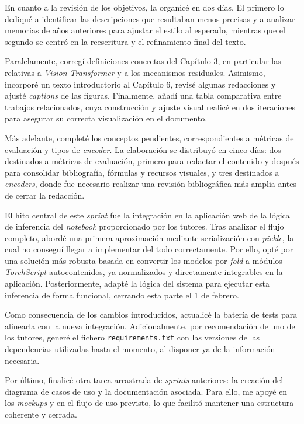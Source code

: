En cuanto a la revisión de los objetivos, la organicé en dos días. El primero lo dediqué a identificar las descripciones que resultaban menos precisas y a analizar memorias de años anteriores para ajustar el estilo al esperado, mientras que el segundo se centró en la reescritura y el refinamiento final del texto.

Paralelamente, corregí definiciones concretas del Capítulo 3, en particular las relativas a \textit{Vision Transformer} y a los mecanismos residuales. Asimismo, incorporé un texto introductorio al Capítulo 6, revisé algunas redacciones y ajusté \textit{captions} de las figuras. Finalmente, añadí una tabla comparativa entre trabajos relacionados, cuya construcción y ajuste visual realicé en dos iteraciones para asegurar su correcta visualización en el documento.

Más adelante, completé los conceptos pendientes, correspondientes a métricas de evaluación y tipos de \textit{encoder}. La elaboración se distribuyó en cinco días: dos destinados a métricas de evaluación, primero para redactar el contenido y después para consolidar bibliografía, fórmulas y recursos visuales, y tres destinados a \textit{encoders}, donde fue necesario realizar una revisión bibliográfica más amplia antes de cerrar la redacción.

El hito central de este \textit{sprint} fue la integración en la aplicación web de la lógica de inferencia del \textit{notebook} proporcionado por los tutores. Tras analizar el flujo completo, abordé una primera aproximación mediante serialización con \textit{pickle}, la cual no conseguí llegar a implementar del todo correctamente. Por ello, opté por una solución más robusta basada en convertir los modelos por \textit{fold} a módulos \textit{TorchScript} autocontenidos, ya normalizados y directamente integrables en la aplicación. Posteriormente, adapté la lógica del sistema para ejecutar esta inferencia de forma funcional, cerrando esta parte el 1 de febrero.

Como consecuencia de los cambios introducidos, actualicé la batería de tests para alinearla con la nueva integración. Adicionalmente, por recomendación de uno de los tutores, generé el fichero \texttt{requirements.txt} con las versiones de las dependencias utilizadas hasta el momento, al disponer ya de la información necesaria.

Por último, finalicé otra tarea arrastrada de \textit{sprints} anteriores: la creación del diagrama de casos de uso y la documentación asociada. Para ello, me apoyé en los \textit{mockups} y en el flujo de uso previsto, lo que facilitó mantener una estructura coherente y cerrada.

